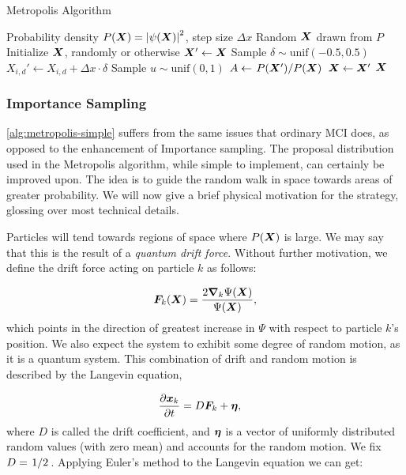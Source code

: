 \documentclass[Thesis.tex]{subfiles}
\begin{document}
\begin{algorithm}[h]
    \caption{Metropolis Algorithm}
    \label{alg:metropolis-simple}
    \begin{algorithmic}[1]
        \Require Probability density $P(\bm{X})=\abs{\psi(\bm{X})}^2$, step size $\Delta x$
        \Ensure Random $\bm{X}$ drawn from $P$
        \State Initialize $\bm{X}$, randomly or otherwise
        \Repeat
            \State $\bm{X}'\gets \bm{X}$
              \State Sample $\delta\sim \text{unif}(-0.5, 0.5)$
              \State $X_{i,d}'\gets X_{i,d} + \Delta x \cdot \delta$
            \EndFor
            \State Sample $u\sim\text{unif}(0, 1)$
            \State $A\gets \flatfrac{P\qty(\vX')}{P\qty(\vX)}$
              \State $\bm{X} \gets \bm{X}'$
            \EndIf
            \State \Yield $\bm{X}$
          \EndFor
    \end{algorithmic}
\end{algorithm}

\subsubsection{Importance Sampling}

\cref{alg:metropolis-simple} suffers from the same issues that ordinary MCI
does, as opposed to the enhancement of Importance sampling. The proposal
distribution used in the Metropolis algorithm, while simple to implement, can
certainly be improved upon. The idea is to guide the random walk in space
towards areas of greater probability. We will now give a brief physical
motivation for the strategy, glossing over most technical details.

Particles will tend towards regions of space where $P(\bm{X})$ is large. We may say
that this is the result of a \emph{quantum drift force}. Without further
motivation, we define the drift force acting on particle $k$ as follows:

\begin{align}
  \bm{F}_k(\bm{X}) = \frac{2\grad_k{\Psi(\bm{X})}}{\Psi(\bm{X})},
\end{align}
which points in the direction of greatest increase in $\Psi$ with respect to
particle $k$'s position. We also expect the
system to exhibit some degree of random motion, as it is a quantum system. This
combination of drift and random motion is described by the Langevin equation,

\begin{align}
 \pdv{\bm{x}_k}{t} &= D\bm{F}_k + \bm{\eta}, 
\end{align}
where $D$ is called the drift coefficient, and $\bm{\eta}$ is a vector of
uniformly distributed random values (with zero mean) and accounts for the random
motion. We fix $D=\flatfrac{1}{2}$. Applying Euler's method to the Langevin
equation we can get:
\end{document}

